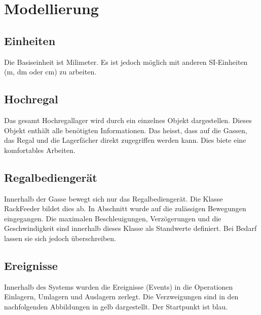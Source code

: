 \section{Modellierung}


\subsection{Einheiten}
Die Basiseinheit ist Milimeter. Es ist jedoch möglich mit anderen SI-Einheiten (m, dm oder cm) zu arbeiten.
%
\subsection{Hochregal}
Das gesamt Hochregallager wird durch ein einzelnes Objekt dargestellen. Dieses Objekt enthält alle benötigten Informationen. Das heisst, dass auf die Gassen, das Regal und die Lagerfächer direkt zugegriffen werden kann. Dies biete eine komfortables Arbeiten.
%
\subsection{Regalbediengerät}
Innerhalb der Gasse bewegt sich nur das Regalbediengerät. Die Klasse RackFeeder bildet dies ab. In Abschnitt wurde auf die zulässigen Bewegungen eingegangen. Die maximalen Beschleuigungen, Verzögerungen und die Geschwindigkeit sind innerhalb dieses Klasse als Standwerte definiert. Bei Bedarf lassen sie sich jedoch überschreiben.
%
\subsection{Ereignisse}
Innerhalb des Systems wurden die Ereignisse (Events) in die Operationen Einlagern, Umlagern und Auslagern zerlegt. Die Verzweigungen sind in den nachfolgenden Abbildungen in gelb dargestellt. Der Startpunkt ist blau. 


